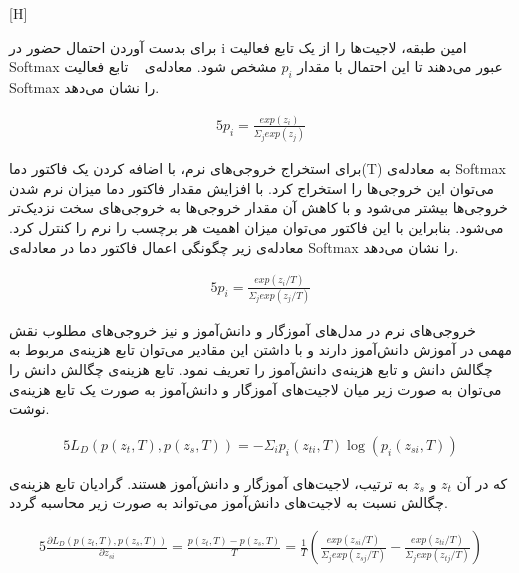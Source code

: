 [H]

برای بدست آوردن احتمال حضور در i امین طبقه، لاجیت‌ها را از یک تابع فعالیت Softmax عبور می‌دهند تا این احتمال با مقدار $p_i$ مشخص شود. معادله‌ی ~ تابع فعالیت Softmax را نشان می‌دهد.

\begin{alignat}{5}
	p_i = \frac{exp(z_i)}{\Sigma_j exp(z_j)}    \label{softmax} 
\end{alignat}

برای استخراج خروجی‌های نرم، با اضافه کردن یک فاکتور دما(T) به معادله‌ی Softmax می‌توان این خروجی‌ها را استخراج کرد. با افزایش مقدار فاکتور دما میزان نرم‌ شدن خروجی‌ها بیشتر می‌شود و با کاهش آن مقدار خروجی‌ها به خروجی‌های سخت نزدیک‌تر می‌شود. بنابراین با این فاکتور می‌توان میزان اهمیت هر برچسب را نرم را کنترل کرد. معادله‌ی زیر چگونگی اعمال فاکتور دما در معادله‌ی Softmax را نشان می‌دهد.

\begin{alignat}{5}
	p_i = \frac{exp(z_i/T)}{\Sigma_j exp(z_j/T)}    \label{softsoftmax} 
\end{alignat}

خروجی‌های نرم در مدل‌های آموزگار و دانش‌آموز و نیز خروجی‌های مطلوب نقش مهمی در آموزش دانش‌آموز دارند و با داشتن این مقادیر می‌توان تابع‌ هزینه‌ی مربوط به چگالش دانش و 
تابع هزینه‌ی دانش‌آموز را تعریف نمود. تابع هزینه‌ی چگالش دانش را می‌توان به صورت زیر میان لاجیت‌های آموز‌گار و دانش‌آموز به صورت یک تابع هزینه‌ی  نوشت. 

\begin{alignat}{5}
	L_D(p(z_t,T), p(z_s,T)) = -\Sigma_i p_i(z_{ti},T) \log(p_i(z_{si},T))    \label{ld} 
\end{alignat}

که در آن $z_t$ و $z_s$ به ترتیب، لاجیت‌های آموزگار و دانش‌آموز هستند. گرادیان تابع‌ هزینه‌ی چگالش نسبت به لاجیت‌های دانش‌آموز می‌تواند به صورت زیر محاسبه گردد.

\begin{alignat}{5}
	\frac{\partial L_D(p(z_t,T), p(z_s,T))}{\partial z_{si}} = \frac{p(z_t,T) - p(z_s,T)}{T}    
	= \frac{1}{T}(\frac{exp(z_{si}/T)}{\Sigma_j exp(z_{sj}/T)}  -\frac{exp(z_{ti}/T)}{\Sigma_j exp(z_{tj}/T)}) \label{gradld}
\end{alignat}

